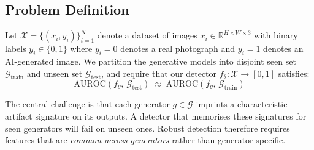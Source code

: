 \documentclass[12pt, a4paper]{article}
\begin{document}
\begin{table}[H]
\centering
\caption{Comparison of deepfake detection approaches relevant to this work.}
\label{tab:related_comparison}
\end{table}

\subsection{Problem Definition}
\label{sec:problem}

Let $\mathcal{X} = \{(x_i, y_i)\}_{i=1}^{N}$ denote a dataset of images
$x_i \in \mathbb{R}^{H \times W \times 3}$ with binary labels $y_i \in \{0,1\}$
where $y_i = 0$ denotes a real photograph and $y_i = 1$ denotes an AI-generated
image.  We partition the generative models into disjoint seen set
$\mathcal{G}_{\text{train}}$ and unseen set $\mathcal{G}_{\text{test}}$, and
require that our detector $f_\theta : \mathcal{X} \rightarrow [0,1]$ satisfies:
\begin{equation}
  \text{AUROC}(f_\theta,\, \mathcal{G}_{\text{test}}) \;\approx\;
  \text{AUROC}(f_\theta,\, \mathcal{G}_{\text{train}})
\end{equation}

The central challenge is that each generator $g \in \mathcal{G}$ imprints a
characteristic artifact signature on its outputs.  A detector that memorises
these signatures for seen generators will fail on unseen ones.  Robust detection
therefore requires features that are \emph{common across generators} rather than
generator-specific.
\end{document}
